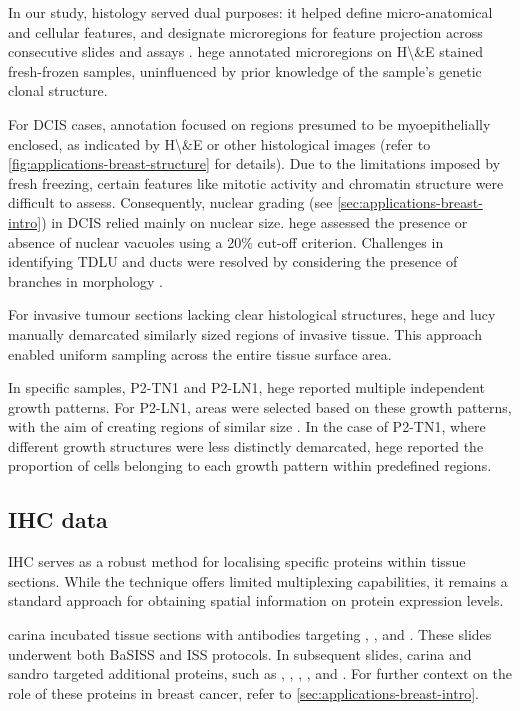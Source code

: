 In our study, histology served dual purposes: it helped define micro-anatomical and cellular features, and designate microregions for feature projection across consecutive slides and assays . \acl{hege} annotated microregions on \acf{H\&E} stained fresh-frozen samples, uninfluenced by prior knowledge of the sample's genetic clonal structure.

For \acf{DCIS} cases, annotation focused on regions presumed to be myoepithelially enclosed, as indicated by \ac{H\&E} or other histological images (refer to \cref{fig:applications-breast-structure} for details). Due to the limitations imposed by fresh freezing, certain features like mitotic activity and chromatin structure were difficult to assess. Consequently, nuclear grading (see \cref{sec:applications-breast-intro}) in \ac{DCIS} relied mainly on nuclear size. \acs{hege} assessed the presence or absence of nuclear vacuoles using a 20\% cut-off criterion. Challenges in identifying \ac{TDLU} and ducts were resolved by considering the presence of branches in morphology .

For invasive tumour sections lacking clear histological structures, \acs{hege} and \acs{lucy} manually demarcated similarly sized regions of invasive tissue. This approach enabled uniform sampling across the entire tissue surface area.

In specific samples, P2-TN1 and P2-LN1, \acs{hege} reported multiple independent growth patterns. For P2-LN1, areas were selected based on these growth patterns, with the aim of creating regions of similar size . In the case of P2-TN1, where different growth structures were less distinctly demarcated, \acs{hege} reported the proportion of cells belonging to each growth pattern within predefined regions.

\subsection{\Acl{IHC} data}
\label{sec:modalities-ihc}

\Acl{IHC} serves as a robust method for localising specific proteins within tissue sections. While the technique offers limited multiplexing capabilities, it remains a standard approach for obtaining spatial information on protein expression levels.

\acf{carina} incubated tissue sections with antibodies targeting , , and . These slides underwent both \ac{BaSISS} and \ac{ISS} protocols. In subsequent slides, \acs{carina} and \acs{sandro} targeted additional proteins, such as , , , , and . For further context on the role of these proteins in breast cancer, refer to \cref{sec:applications-breast-intro}.

